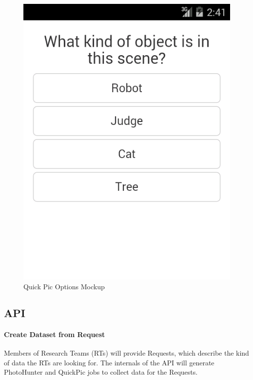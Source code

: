 \documentclass{article}
\begin{document}
\begin{figure}[H]
  \caption{Quick Pic Options Mockup}
  \centering
  \includegraphics[width =\textwidth, height=\textheight, keepaspectratio]{ss_quickpic_options}
\end{figure}

\subsection{API}

\paragraph{Create Dataset from Request}

Members of Research Teams (RTs) will provide Requests, which describe
the kind of data the RTs are looking for.  The internals of the API will
generate PhotoHunter and QuickPic jobs to collect data for the
Requests.
\end{document}
